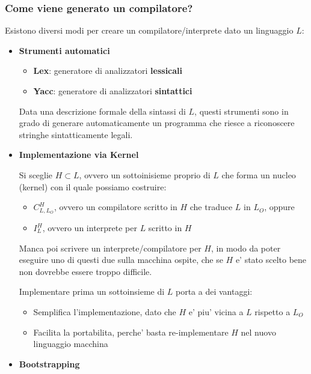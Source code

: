 
\subsubsection{Come viene generato un compilatore?}

Esistono diversi modi per creare un compilatore/interprete dato un linguaggio $ L $:
\begin{itemize}
  \item \textbf{Strumenti automatici}
    \begin{itemize}
      \item \textbf{Lex}: generatore di analizzatori \textbf{lessicali}
      \item \textbf{Yacc}: generatore di analizzatori \textbf{sintattici}
    \end{itemize}
    Data una descrizione formale della sintassi di $ L $, questi strumenti sono in grado di generare automaticamente un programma che riesce a riconoscere stringhe sintatticamente legali.
  \item \textbf{Implementazione via Kernel}

    Si sceglie $ H \subset L $, ovvero un sottoinisieme proprio di $ L $ che forma un nucleo (kernel) con il quale possiamo costruire:
    \begin{itemize}
      \item $ C^H_{L, L_O} $, ovvero un compilatore scritto in $ H $ che traduce $ L $ in $ L_O $, oppure
      \item $ I^H_L $, ovvero un interprete per $ L $ scritto in $ H $
    \end{itemize}
    Manca poi scrivere un interprete/compilatore per $ H $, in modo da poter eseguire uno di questi due sulla macchina ospite, che se $ H $ e' stato scelto bene non dovrebbe essere troppo difficile.

    Implementare prima un sottoinsieme di $ L $ porta a dei vantaggi:
    \begin{itemize}
      \item Semplifica l'implementazione, dato che $ H $ e' piu' vicina a $ L $ rispetto a $ L_O $
      \item Facilita la portabilita, perche' basta re-implementare $ H $ nel nuovo linguaggio macchina
    \end{itemize}
  \item \textbf{Bootstrapping}


\end{itemize}

